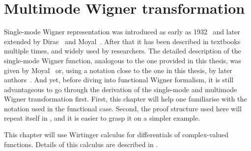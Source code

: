 \chapter{Multimode Wigner transformation}
\label{cha:mm-wigner}

Single-mode Wigner representation was introduced as early as 1932~\cite{Wigner1932} and later extended by Dirac~\cite{Dirac1945} and Moyal~\cite{Moyal1947}.
After that it has been described in textbooks multiple times, and widely used by researchers.
The detailed description of the single-mode Wigner function, analogous to the one provided in this thesis, was given by Moyal~\cite{Moyal1947} or, using a notation close to the one in this thesis, by later authors~\cite{Cahill1969,Hillery1984,Gardiner2004}.
And yet, before diving into functional Wigner formalism, it is still advantageous to go through the derivation of the single-mode and multimode Wigner transformation first.
First, this chapter will help one familiarise with the notation used in the functional case.
Second, the proof structure used here will repeat itself in , and it is easier to grasp it on a simpler example.

This chapter will use Wirtinger calculus for differentials of complex-valued functions.
Details of this calculus are described in .




